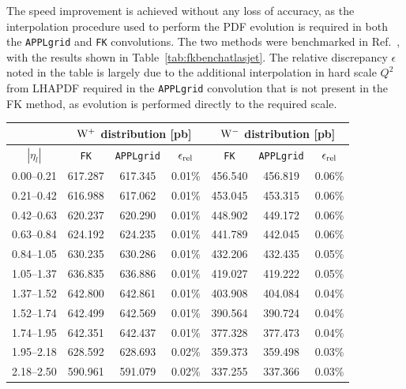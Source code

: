 The speed improvement is achieved without any loss of accuracy, as the interpolation procedure used to perform the PDF evolution is required in both the { \tt APPLgrid} and {\tt FK} convolutions. The two methods were benchmarked in Ref.~\cite{Ball:2012cx}, with the results shown in Table~\ref{tab:fkbenchatlasjet}. The relative discrepancy $\epsilon$ noted in the table is largely due to the additional interpolation in hard scale $Q^2$ from LHAPDF required in the { \tt APPLgrid} convolution that is not present in the {\tt} FK method, as evolution is performed directly to the required scale.

\begin{table}[ht!]
\begin{center}
\footnotesize
\begin{tabular}{c|c|c|c||c|c|c|}
\cline{2-7}
   & \multicolumn{3}{|c||}{${\rm W}^{+}$ distribution [pb]} & \multicolumn{3}{|c|}{${\rm W}^{-}$ distribution [pb]}  \\
\hline
\multicolumn{1}{|c||}{$| \eta_{l} |$} & {\tt FK}	 & {\tt APPLgrid} &  $\epsilon_{\rm rel}$ & {\tt FK}  &  {\tt APPLgrid} &  $\epsilon_{\rm rel}$\\
\hline
\multicolumn{1}{|c||}{0.00--0.21} & 617.287 & 617.345 & 0.01\% & 456.540 & 456.819 & 0.06\% \\
\multicolumn{1}{|c||}{0.21--0.42} & 616.988 & 617.062 & 0.01\% & 453.045 & 453.315 & 0.06\%\\
\multicolumn{1}{|c||}{0.42--0.63} & 620.237 & 620.290 & 0.01\% & 448.902 & 449.172 & 0.06\%\\
\multicolumn{1}{|c||}{0.63--0.84} & 624.192 & 624.235 & 0.01\% & 441.789 & 442.045 & 0.06\%\\
\multicolumn{1}{|c||}{0.84--1.05} & 630.235 & 630.286 & 0.01\% & 432.206 & 432.435 & 0.05\%\\
\multicolumn{1}{|c||}{1.05--1.37} & 636.835 & 636.886 & 0.01\% & 419.027 & 419.222 & 0.05\%\\
\multicolumn{1}{|c||}{1.37--1.52} & 642.800 & 642.861 & 0.01\% & 403.908 & 404.084 & 0.04\%\\
\multicolumn{1}{|c||}{1.52--1.74} & 642.499 & 642.569 & 0.01\% & 390.564 & 390.724 & 0.04\%\\
\multicolumn{1}{|c||}{1.74--1.95} & 642.351 & 642.437 & 0.01\% & 377.328 & 377.473 & 0.04\%\\ 
\multicolumn{1}{|c||}{1.95--2.18} & 628.592 & 628.693 & 0.02\% & 359.373 & 359.498 & 0.03\%\\
\multicolumn{1}{|c||}{2.18--2.50} & 590.961 & 591.079 & 0.02\% & 337.255 & 337.366 & 0.03\% \\
\hline
 \end{tabular}
 

\end{center}
\end{table}
